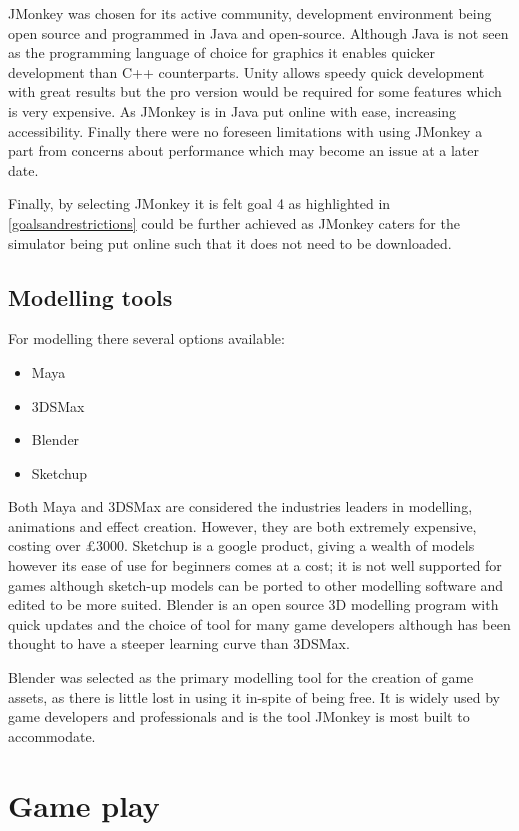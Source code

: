 \documentclass[11pt]{report}
\begin{document}
JMonkey was chosen for its active community, development environment being open source and programmed in Java and open-source. Although Java is not seen as the programming language of choice for graphics it enables quicker development than C++ counterparts. Unity allows speedy quick development with great results but the pro version would be required for some features which is very expensive. As JMonkey is in Java put online with ease, increasing accessibility. Finally there were no foreseen limitations with using JMonkey a part from concerns about performance which may become an issue at a later date.

Finally, by selecting JMonkey it is felt goal 4 as highlighted in \ref{goalsandrestrictions} could be further achieved as JMonkey caters for the simulator being put online such that it does not need to be downloaded.

\subsection{Modelling tools}
For modelling there several options available:
\begin{itemize}
\item Maya
\item 3DSMax
\item Blender
\item Sketchup
\end{itemize}

Both Maya and 3DSMax are considered the industries leaders in modelling, animations and effect creation. However, they are both extremely expensive, costing over £3000. Sketchup is a google product, giving a wealth of models however its ease of use for beginners comes at a cost; it is not well supported for games although sketch-up models can be ported to other modelling software and edited to be more suited. Blender is an open source 3D modelling program with quick updates and the choice of tool for many game developers although has been thought to have a steeper learning curve than 3DSMax.

Blender was selected as the primary modelling tool for the creation of game assets, as there is little lost in using it in-spite of being free. It is widely used by game developers and professionals and is the tool JMonkey is most built to accommodate.

\section{Game play}
\end{document}
